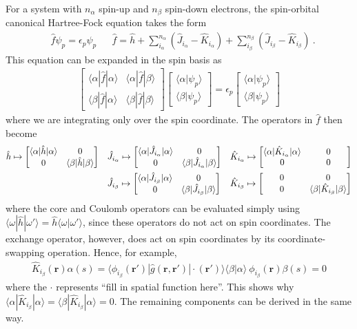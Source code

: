 \documentclass[11pt,fleqn]{article}
\renewcommand{\a}{\alpha}    %
\renewcommand{\b}{\beta}     %
\newcommand{\ev}{\epsilon}   %
\newcommand{\f}{\phi}        %
\newcommand{\y}{\psi}        %
\newcommand{\w}{\omega}      %
\newcommand{\op}[1]{\ensuremath{\hat{#1}}}
\newcommand{\bo}[1]{\ensuremath{\mathbf{#1}}}
\newcommand{\ip}[1]{\ensuremath{\langle#1\rangle}}
\newcommand{\ma}[1]{\ensuremath{\begin{bmatrix}#1\end{bmatrix}}}
\theoremstyle{mystyle}
\begin{document}
For a system with $n_\a$ spin-up and $n_\b$ spin-down electrons, the spin-orbital canonical Hartree-Fock equation takes the form
\begin{align}
\label{canonical-hf}
&
  \op{f}\y_p
=
  \ev_p\y_p
&&
  \op{f}
=
  \op{h}
+
  \sum_{i_\a}^{n_\a}
  (\op{J}_{i_\a}-\op{K}_{i_\a})
+
  \sum_{i_\b}^{n_\b}
  (\op{J}_{i_\b}-\op{K}_{i_\b})\ .
\end{align}
This equation can be expanded in the spin basis as
\begin{align*}
  \ma{
    \ip{\a|\op{f}|\a}&\ip{\a|\op{f}|\b}\\
    \ip{\b|\op{f}|\a}&\ip{\b|\op{f}|\b}}
  \ma{
    \ip{\a|\y_p}\\
    \ip{\b|\y_p}}
=
  \ev_p
  \ma{
    \ip{\a|\y_p}\\
    \ip{\b|\y_p}}
\end{align*}
where we are integrating only over the spin coordinate.
The operators in $\op{f}$ then become
\begin{align*}
&
  \op{h}
\mapsto
  \ma{
    \ip{\a|\op{h}|\a}&0\\
    0&\ip{\b|\op{h}|\b}}
&&
  \op{J}_{i_\a}
\mapsto
  \ma{
    \ip{\a|\op{J}_{i_\a}|\a}&0\\
    0&\ip{\b|\op{J}_{i_\a}|\b}}
&&
  \op{K}_{i_\a}
\mapsto
  \ma{
    \ip{\a|\op{K}_{i_\a}|\a}&0\\
    0&\makebox[\widthof{\ip{\b|\op{K}_{i_\b}|\b}}]{0}}
\\
&
&&
  \op{J}_{i_\b}
\mapsto
  \ma{
    \ip{\a|\op{J}_{i_\b}|\a}&0\\
    0&\ip{\b|\op{J}_{i_\b}|\b}}
&&
  \op{K}_{i_\b}
\mapsto
  \ma{
    \makebox[\widthof{\ip{\a|\op{K}_{i_\a}|\a}}]{0}&0\\
    0&\ip{\b|\op{K}_{i_\b}|\b}}
\end{align*}
where the core and Coulomb operators can be evaluated simply using $\ip{\w|\op{h}|\w'}=\op{h}\ip{\w|\w'}$, since these operators do not act on spin coordinates.
The exchange operator, however, does act on spin coordinates by its coordinate-swapping operation.
Hence, for example,
\begin{align*}
  \op{K}_{i_\b}(\bo{r})\a(s)
=
  \ip{\f_{i_\b}(\bo{r}')|\op{g}(\bo{r},\bo{r}')|\cdot(\bo{r}')}
  \ip{\b|\a}\
  \f_{i_\b}(\bo{r})\b(s)
=
  0
\end{align*}
where the $\cdot$ represents ``fill in spatial function here''.
This shows why $\ip{\a|\op{K}_{i_\b}|\a}=\ip{\b|\op{K}_{i_\b}|\a}=0$.
The remaining components can be derived in the same way.
\end{document}
